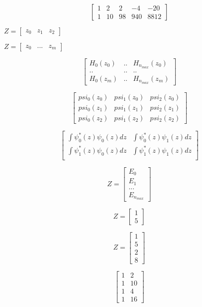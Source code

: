 \documentclass{article}
\begin{document}
\[ \begin{bmatrix} 1 & 2 & 2 & -4 & -20 \\ 1 & 10 & 98 & 940 & 8812 \end{bmatrix} \]
\pagebreak

$Z=\begin{bmatrix} z_0 & z_1 & z_2 \end{bmatrix}$
\pagebreak

$Z=\begin{bmatrix} z_0 & ... & z_m \end{bmatrix}$
\pagebreak

\[ \begin{bmatrix} H_0(z_0) & .. & H_{n_{max}}(z_0) \\ .. & .. & .. \\ H_0(z_m) & .. & H_{n_{max}}(z_m) \end{bmatrix} \]
\pagebreak

\[ \begin{bmatrix} psi_0(z_0) & psi_1(z_0) & psi_2(z_0) \\ psi_0(z_1) & psi_1(z_1) & psi_2(z_1) \\ psi_0(z_2) & psi_1(z_2) & psi_2(z_2) \end{bmatrix} \]
\pagebreak

\[ \begin{bmatrix} \int \psi^*_0(z)\psi_0(z) dz & \int \psi^*_0(z)\psi_1(z) dz \\ \int \psi^*_1(z)\psi_0(z) dz & \int \psi^*_1(z)\psi_1(z) dz \\ \end{bmatrix} \]
\pagebreak

\[Z= \begin{bmatrix} E_0 \\ E_1 \\ ... \\ E_{n_{max}} \end{bmatrix} \]
\pagebreak

\[Z= \begin{bmatrix} 1 \\ 5 \end{bmatrix} \]
\pagebreak

\[ Z=\begin{bmatrix} 1 \\ 5 \\ 2 \\ 8 \end{bmatrix} \]
\pagebreak

\[ \begin{bmatrix} 1 & 2\\ 1 & 10\\ 1 & 4\\ 1 & 16 \end{bmatrix} \]
\pagebreak
\end{document}
